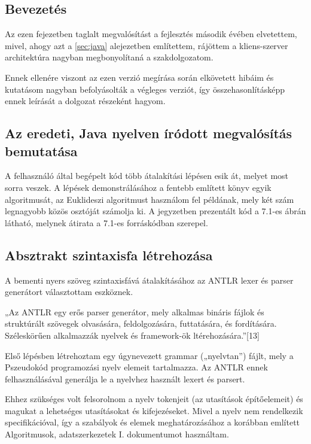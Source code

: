 \subsection{Bevezetés}

Az ezen fejezetben taglalt megvalósítást a fejlesztés második évében elvetettem, mivel, ahogy azt a \ref{sec:java} alejezetben említettem, rájöttem a kliens-szerver architektúra nagyban megbonyolítaná a szakdolgozatom.

Ennek ellenére viszont az ezen verzió megírása során elkövetett hibáim és kutatásom nagyban befolyásolták a végleges verziót, így összehasonlításképp ennek leírását a dolgozat részeként hagyom.

\subsection{Az eredeti, Java nyelven íródott megvalósítás bemutatása}

A felhasználó által begépelt kód több átalakítási lépésen esik át, melyet most sorra veszek. A lépések demonstrálásához a fentebb említett könyv egyik algoritmusát, az Euklideszi algoritmust használom fel példának, mely két szám legnagyobb közös osztóját számolja ki. A jegyzetben prezentált kód a 7.1-es ábrán látható, melynek átirata a 7.1-es forráskódban szerepel.

\subsection{Absztrakt szintaxisfa létrehozása}

A bementi nyers szöveg szintaxisfává átalakításához az ANTLR lexer és parser generátort választottam eszköznek.

„Az ANTLR egy erős parser generátor, mely alkalmas bináris fájlok és struktúrált szövegek olvasására, feldolgozására, futtatására, és fordítására. Széleskörűen alkalmazzák nyelvek és framework-ök ltérehozására.”[13]

Első lépésben létrehoztam egy úgynevezett grammar („nyelvtan”) fájlt, mely a Pszeudokód programozási nyelv elemeit tartalmazza. Az ANTLR ennek felhasználásával generálja le a nyelvhez használt lexert és parsert.

Ehhez szükséges volt felsorolnom a nyelv tokenjeit (az utasítások építőelemeit) és magukat a lehetséges utasításokat és kifejezéseket. Mivel a nyelv nem rendelkezik specifikációval, így a szabályok és elemek meghatározásához a korábban említett Algoritmusok, adatszerkezetek I. dokumentumot használtam.

